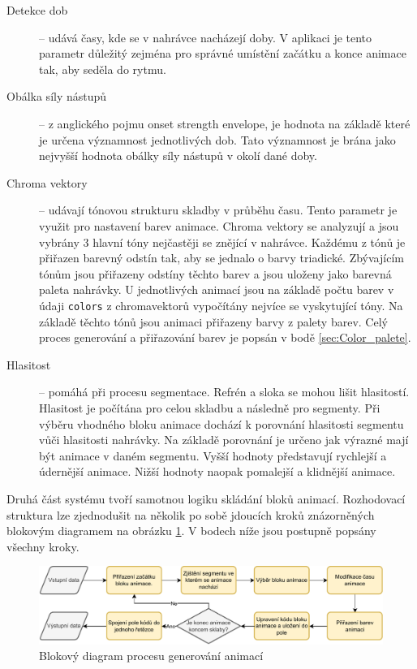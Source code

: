 \begin{description}
    \item[Detekce dob] -- udává časy, kde se v nahrávce nacházejí doby. V aplikaci je tento parametr důležitý zejména pro správné umístění začátku a konce animace tak, aby seděla do rytmu. 

    \item[Obálka síly nástupů] -- z anglického pojmu onset strength envelope, je hodnota na základě které je určena významnost jednotlivých dob. Tato významnost je brána jako nejvyšší hodnota obálky síly nástupů v okolí dané doby.
     
    \item[Chroma vektory] -- udávají tónovou strukturu skladby v průběhu času. Tento parametr je využit pro nastavení barev animace. Chroma vektory se analyzují a jsou vybrány 3 hlavní tóny nejčastěji se znějící v nahrávce. Každému z tónů je přiřazen barevný odstín tak, aby se jednalo o barvy triadické. Zbývajícím tónům jsou přiřazeny odstíny těchto barev a jsou uloženy jako barevná paleta nahrávky. U jednotlivých animací jsou na základě počtu barev v údaji \texttt{colors} z chromavektorů vypočítány nejvíce se vyskytující tóny. Na základě těchto tónů jsou animaci přiřazeny barvy z palety barev. Celý proces generování a přiřazování barev je popsán v bodě \ref{sec:Color_palete}.

    \item[Hlasitost] -- pomáhá při procesu segmentace. Refrén a sloka se mohou lišit hlasitostí. Hlasitost je počítána pro celou skladbu a následně pro segmenty. Při výběru vhodného bloku animace dochází k porovnání hlasitosti segmentu vůči hlasitosti nahrávky. Na základě porovnání je určeno jak výrazné mají být animace v daném segmentu. Vyšší hodnoty představují rychlejší a údernější animace. Nižší hodnoty naopak pomalejší a klidnější animace.
\end{description}


Druhá část systému tvoří samotnou logiku skládání bloků animací. Rozhodovací struktura lze zjednodušit na několik po sobě jdoucích kroků znázorněných blokovým diagramem na obrázku \ref{fig:diagram_procesu_generovani_animaci}. V bodech níže jsou postupně popsány všechny kroky.

\begin{figure}[H]
    \centering
    \includegraphics[width = 1\linewidth]{obrazky/UML_diagramy_anim_generation_process.pdf}
    \caption{Blokový diagram procesu generování animací}
    \label{fig:diagram_procesu_generovani_animaci}
\end{figure}

